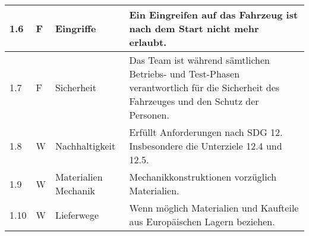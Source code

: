 \documentclass[main.tex]{subfiles} %
\begin{document}
\begin{tabular}{|l|p{0.5cm}|p{4cm}|p{10cm}|}
  \hline
  1.6          & F          & Eingriffe            & Ein Eingreifen auf das Fahrzeug ist nach dem Start nicht mehr erlaubt.                                                                                                                                                       \\
  \hline
  1.7          & F          & Sicherheit           & Das Team ist während sämtlichen Betriebs- und Test-Phasen verantwortlich für die Sicherheit des Fahrzeuges und den Schutz der Personen.                                                                                      \\
  \hline
  1.8          & W          & Nachhaltigkeit       & Erfüllt Anforderungen nach SDG 12. Insbesondere die Unterziele 12.4 und 12.5.                                                                                                                                                \\
  \hline
  1.9          & W          & Materialien Mechanik & Mechanikkonstruktionen vorzüglich Materialien.                                                                                                                                                                               \\
  \hline
  1.10         & W          & Lieferwege           & Wenn möglich Materialien und Kaufteile aus Europäischen Lagern beziehen.                                                                                                                                                     \\
  \hline
\end{tabular}
\end{document}
